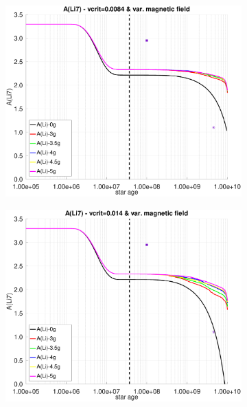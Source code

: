\documentclass[fleqn,usenatbib]{mnras}
\begin{document}
\begin{figure}
    \centering
    \begin{subfigure}[h]{0.47\textwidth}
    \includegraphics[trim = 25mm 10mm 15mm 10mm, clip,width=\textwidth]{figures/li_vc_0084_var_g.eps}
    \label{fig:subim21}
    \end{subfigure}
    \begin{subfigure}[h]{0.47\textwidth}
    \includegraphics[trim = 25mm 10mm 15mm 10mm, clip,width=\textwidth]{figures/li_vc_014_var_g.eps}
    \label{fig:subim22}
    \end{subfigure}

\end{figure}
\end{document}
